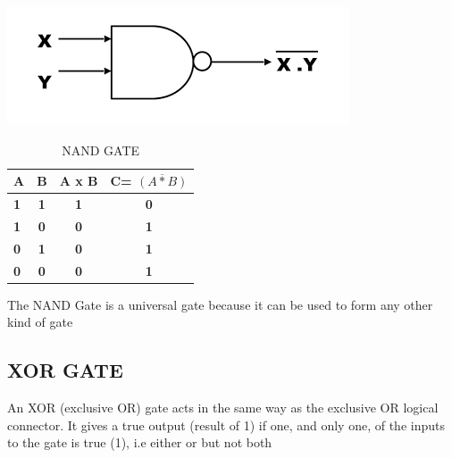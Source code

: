 \documentclass{article}
\begin{document}
\includegraphics[width=0.7\linewidth]{nand}
\begin{table}[h!]
	\begin{center}
		\caption{NAND GATE}
		\begin{tabular}{l|c|c|c|}
			\textbf{A} & \textbf{B} & \textbf{A x B} & \textbf{C= $\overline{(A * B)}$} \\
			\hline
			\textbf{1} & \textbf{1} & \textbf{1} & \textbf{0} \\
			\textbf{1} & \textbf{0} & \textbf{0} & \textbf{1} \\
			\textbf{0} & \textbf{1} & \textbf{0} & \textbf{1} \\
			\textbf{0} & \textbf{0} & \textbf{0} & \textbf{1} \\
		\end{tabular}
	\end{center}
\end{table}

The NAND Gate is a universal gate because it can be used to form any other kind of gate 
\newpage
\subsection{XOR GATE}
An XOR (exclusive OR) gate acts in the same way as the exclusive OR logical connector. 
It gives a true output (result of 1) if one, and only one, of the inputs to the gate is true (1), i.e either or but not both
\end{document}
